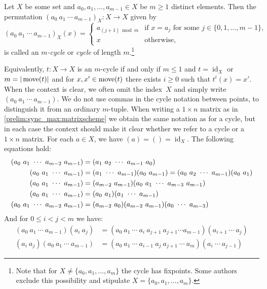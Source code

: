 
 \label{def:cycle-notation}
Let $X$ be some set and $a_0, a_1, \ldots, a_{m-1} \in X$ be $m \ge 1$ distinct elements.
Then the permutation $(a_0 ~ a_1 ~ \cdots ~ a_{m-1})_X \colon X \to X$ 
given by 
\[
(a_0 ~ a_1 ~ \cdots ~ a_{m-1})_X(x) = 
\begin{cases} 
	a_{(j+1) \bmod m} & \text{if } x = a_j \text{ for some } j \in \{0,1,\ldots,m-1\}, \\
	x & \text{otherwise,}
\end{cases} 
\]
is called an \emph{$m$-cycle} or \emph{cycle} of length $m$.\footnote{Note that for $X \ne \{a_0,a_1, \ldots, a_m\}$
	the cycle has fixpoints. Some authors exclude this possibility and 
	stipulate $X = \{a_0,a_1, \ldots, a_m\}$.}

Equivalently, $t \colon X \to X$ is an $m$-cycle if and only if
$m \le 1$ and $t = \operatorname{id}_X$ 
or $m = |\move{t}|$ and for $x,x' \in \move{t}$
there exists $i \ge 0$
such that $t^i(x) = x'$.
When the context is clear, we often omit the index~$X$ and simply write $(a_0 ~ a_1 ~ \cdots ~ a_{m-1})$.
We do not use commas in the cycle notation between points, 
to distinguish it from an ordinary $m$-tuple.
When writing a $1 \times n$ matrix as in \cref{prelim:sync_max:matrixscheme} 
we obtain the same notation as for a cycle,
but in each case the context should make it clear whether we refer to a cycle or a $1 \times n$ matrix.
For each $a \in X$, we have $(a) = () = \operatorname{id}_X$.
The following equations hold:
\begingroup
\allowdisplaybreaks 
\begin{align}
	(a_0 ~ a_1  ~\cdots~  a_{m-2} ~ a_{m-1}) & = (a_1 ~ a_2 ~ \cdots ~ a_{m-1} ~ a_0) \\
	(a_0 ~ a_1  ~\cdots~  a_{m-1}) & = (a_1 ~\cdots~ a_{m-1})(a_0 ~ a_{m-1}) = (a_0 ~ a_2 ~ \cdots ~ a_{m-1}) (a_0 ~ a_1) \label{prelim:eqn:cycletrans1} \\
	(a_0 ~ a_1  ~\cdots~  a_{m-1}) & = (a_{m-2} ~ a_{m-1})(a_0 ~ a_1  ~\cdots~  a_{m-3} ~ a_{m-1}) \label{prelim:eqn:cycletrans2} \\		
	(a_0 ~ a_1  ~\cdots~  a_{m-1}) & = (a_0 ~ a_1)( a_1 ~\cdots~ a_{m-1}) \\		
	(a_0 ~ a_1  ~\cdots~ a_{m-2} ~ a_{m-1}) & = \concat{\concat{(a_0 ~\cdots~ a_{m-3})}{(a_{m-2} ~ a_{m-1})}}{(a_{m-2} ~ a_0)} 
\end{align}
\endgroup%
And for $0 \le i < j < m$ we have:
\begin{align*}
	(a_0 ~ a_1 ~\cdots~ a_{m-1})(a_i ~ a_j)
	& = (a_0 ~ a_1 ~\cdots~ a_{i} ~ a_{j+1} ~ a_{j+1} \cdots a_{m-1})(a_{i+1} ~\cdots ~ a_j) \\
	(a_i ~ a_j)(a_0 ~ a_1 ~\cdots~ a_{m-1})
	& = (a_0 ~ a_1 ~\cdots~ a_{i-1} ~ a_j ~ a_{j+1} ~\cdots~ a_m)(a_i ~ \cdots ~ a_{j-1})
\end{align*}

